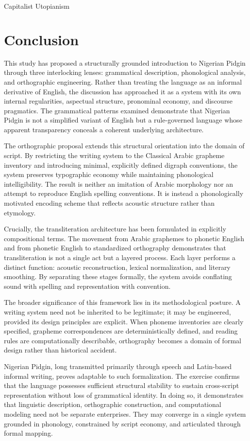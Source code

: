 \documentclass[12pt]{article}
\begin{document}
Capitalist Utopianism

\section*{Conclusion}

This study has proposed a structurally grounded introduction to Nigerian Pidgin through three interlocking lenses: grammatical description, phonological analysis, and orthographic engineering. Rather than treating the language as an informal derivative of English, the discussion has approached it as a system with its own internal regularities, aspectual structure, pronominal economy, and discourse pragmatics. The grammatical patterns examined demonstrate that Nigerian Pidgin is not a simplified variant of English but a rule-governed language whose apparent transparency conceals a coherent underlying architecture.

The orthographic proposal extends this structural orientation into the domain of script. By restricting the writing system to the Classical Arabic grapheme inventory and introducing minimal, explicitly defined digraph conventions, the system preserves typographic economy while maintaining phonological intelligibility. The result is neither an imitation of Arabic morphology nor an attempt to reproduce English spelling conventions. It is instead a phonologically motivated encoding scheme that reflects acoustic structure rather than etymology.

Crucially, the transliteration architecture has been formulated in explicitly compositional terms. The movement from Arabic graphemes to phonetic English and from phonetic English to standardized orthography demonstrates that transliteration is not a single act but a layered process. Each layer performs a distinct function: acoustic reconstruction, lexical normalization, and literary smoothing. By separating these stages formally, the system avoids conflating sound with spelling and representation with convention.

The broader significance of this framework lies in its methodological posture. A writing system need not be inherited to be legitimate; it may be engineered, provided its design principles are explicit. When phoneme inventories are clearly specified, grapheme correspondences are deterministically defined, and reading rules are computationally describable, orthography becomes a domain of formal design rather than historical accident.

Nigerian Pidgin, long transmitted primarily through speech and Latin-based informal writing, proves adaptable to such formalization. The exercise confirms that the language possesses sufficient structural stability to sustain cross-script representation without loss of grammatical identity. In doing so, it demonstrates that linguistic description, orthographic construction, and computational modeling need not be separate enterprises. They may converge in a single system grounded in phonology, constrained by script economy, and articulated through formal mapping.
\end{document}

